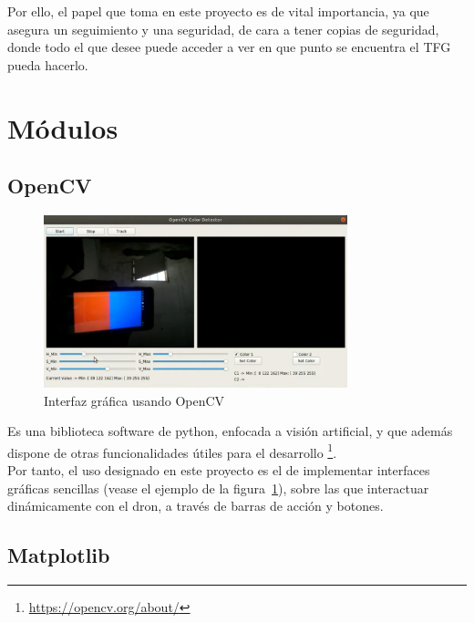Por ello, el papel que toma en este proyecto es de vital importancia, ya que asegura un seguimiento y una seguridad, de cara a tener copias de seguridad, donde todo el que desee puede acceder a ver en que punto se encuentra el \ac{TFG} pueda hacerlo.\\

\section{Módulos}
\label{sec:modulos}

\subsection{OpenCV}
\label{subsec:opencv}

\begin{figure} [tp]
	\begin{center}
	\includegraphics[height=5cm]{imagenes/cap3/5_opencv_example.png}
	\end{center}
	\caption[Interfaz gráfica usando OpenCV]{Interfaz gráfica usando OpenCV}
	\label{fig:opencv}
\end{figure}

Es una biblioteca software de python, enfocada a visión artificial, y que además dispone de otras funcionalidades útiles para el desarrollo \footnote[11]{\url{https://opencv.org/about/}}.\\

Por tanto, el uso designado en este proyecto es el de implementar interfaces gráficas sencillas (vease el ejemplo de la figura~\ref{fig:opencv}), sobre las que interactuar dinámicamente con el dron, a través de barras de acción y botones.

\subsection{Matplotlib}
\label{subsec:matplotlib}

